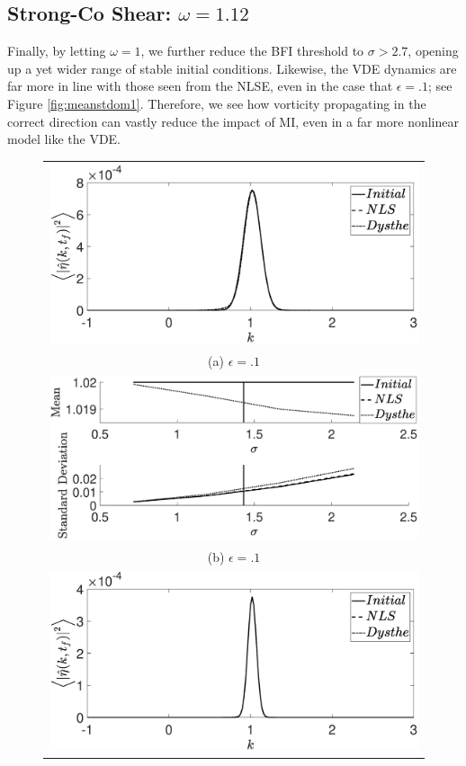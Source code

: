 \documentclass[a4paper,11pt]{article}
\begin{document}
\subsection*{Strong-Co Shear: $\omega = 1.12$}

Finally, by letting $\omega=1$, we further reduce the BFI threshold to $\sigma > 2.7$, opening up a yet wider range of stable initial conditions.  Likewise, the VDE dynamics are far more in line with those seen from the NLSE, even in the case that $\epsilon=.1$; see Figure \ref{fig:meanstdom1}.  Therefore, we see how vorticity propagating in the correct direction can vastly reduce the impact of MI, even in a far more nonlinear model like the VDE.  

\begin{figure}[!ht]
\centering
\begin{tabular}{c}
\includegraphics[width=.65\textwidth]{pdf_w_1pt12_ep_pt1_Nens_512} \\
(a) $\epsilon=.1$\\
\includegraphics[width=.65\textwidth]{omega_1pt12_mean_std_plot_ep_pt1}\\
(b) $\epsilon=.1$ \\
\includegraphics[width=.65\textwidth]{pdf_w_1pt12_ep_pt05_Nens_512}\\

\end{tabular}
\end{figure}
\end{document}
